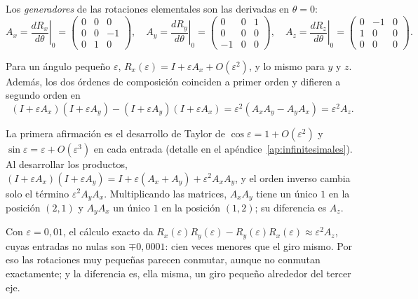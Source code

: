 \begin{definicion}
Los \emph{generadores} de las rotaciones elementales son las derivadas en \(\theta=0\):
\[
A_x=\left.\frac{dR_x}{d\theta}\right|_{0}=
\begin{pmatrix}0&0&0\\0&0&-1\\0&1&0\end{pmatrix},\quad
A_y=\left.\frac{dR_y}{d\theta}\right|_{0}=
\begin{pmatrix}0&0&1\\0&0&0\\-1&0&0\end{pmatrix},\quad
A_z=\left.\frac{dR_z}{d\theta}\right|_{0}=
\begin{pmatrix}0&-1&0\\1&0&0\\0&0&0\end{pmatrix}.
\]
\end{definicion}

\begin{proposicion}\label{prop:rot-pequenas}
Para un ángulo pequeño \(\varepsilon\),
\(R_x(\varepsilon)=I+\varepsilon A_x+O(\varepsilon^2)\), y lo mismo para \(y\) y \(z\).
Además, los dos órdenes de composición coinciden a primer orden y difieren a segundo orden en
\[
(I+\varepsilon A_x)(I+\varepsilon A_y)-(I+\varepsilon A_y)(I+\varepsilon A_x)
=\varepsilon^2(A_xA_y-A_yA_x)=\varepsilon^2A_z.
\]
\end{proposicion}

\begin{demostracion}
La primera afirmación es el desarrollo de Taylor de \(\cos\varepsilon=1+O(\varepsilon^2)\) y
\(\sin\varepsilon=\varepsilon+O(\varepsilon^3)\) en cada entrada (detalle en el
apéndice~\ref{ap:infinitesimales}). Al desarrollar los productos,
\((I+\varepsilon A_x)(I+\varepsilon A_y)=I+\varepsilon(A_x+A_y)+\varepsilon^2A_xA_y\), y el
orden inverso cambia solo el término \(\varepsilon^2A_yA_x\). Multiplicando las matrices,
\(A_xA_y\) tiene un único \(1\) en la posición \((2,1)\) y \(A_yA_x\) un único \(1\) en la
posición \((1,2)\); su diferencia es \(A_z\).
\end{demostracion}

\begin{ejemplo}
Con \(\varepsilon=0{,}01\), el cálculo exacto da
\(R_x(\varepsilon)R_y(\varepsilon)-R_y(\varepsilon)R_x(\varepsilon)\approx\varepsilon^2A_z\),
cuyas entradas no nulas son \(\mp0{,}0001\): cien veces menores que el giro mismo. Por eso las
rotaciones muy pequeñas parecen conmutar, aunque no conmutan exactamente; y la diferencia es,
ella misma, un giro pequeño alrededor del tercer eje.
\end{ejemplo}

